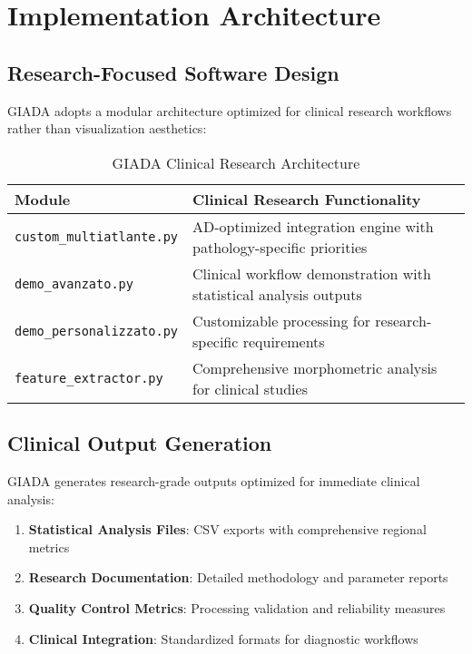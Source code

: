 \documentclass[a4paper,11pt]{article}
\begin{document}
\section{Implementation Architecture}

\subsection{Research-Focused Software Design}

GIADA adopts a modular architecture optimized for clinical research workflows rather than visualization aesthetics:

\begin{table}[ht]
\centering
\caption{GIADA Clinical Research Architecture}
\label{tab:research_architecture}
\begin{tabular}{@{}lp{10cm}@{}}
\toprule
\textbf{Module} & \textbf{Clinical Research Functionality} \\
\midrule
\texttt{custom\_multiatlante.py} & AD-optimized integration engine with pathology-specific priorities \\
\texttt{demo\_avanzato.py} & Clinical workflow demonstration with statistical analysis outputs \\
\texttt{demo\_personalizzato.py} & Customizable processing for research-specific requirements \\
\texttt{feature\_extractor.py} & Comprehensive morphometric analysis for clinical studies \\
\bottomrule
\end{tabular}
\end{table}

\subsection{Clinical Output Generation}

GIADA generates research-grade outputs optimized for immediate clinical analysis:

\begin{enumerate}
    \item \textbf{Statistical Analysis Files}: CSV exports with comprehensive regional metrics
    \item \textbf{Research Documentation}: Detailed methodology and parameter reports
    \item \textbf{Quality Control Metrics}: Processing validation and reliability measures
    \item \textbf{Clinical Integration}: Standardized formats for diagnostic workflows
\end{enumerate}
\end{document}
